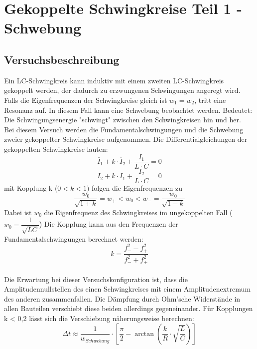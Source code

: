 \documentclass[12pt,a4paper]{article}
\begin{document}
\newpage
\section{Gekoppelte Schwingkreise Teil 1 - Schwebung}
\subsection{Versuchsbeschreibung}
Ein LC-Schwingkreis kann induktiv mit einem zweiten LC-Schwingkreis gekoppelt werden, der dadurch zu erzwungenen Schwingungen angeregt wird. Falls die Eigenfrequenzen der Schwingkreise gleich ist $w_1 = w_2$, tritt eine Resonanz auf. In diesem Fall kann eine Schwebung beobachtet werden. Bedeutet: Die Schwingungsenergie "schwingt" zwischen den Schwingkreisen hin und her. \\
Bei diesem Versuch werden die Fundamentalschwingungen und die Schwebung zweier gekoppelter Schwingkreise aufgenommen. Die Differentialgleichungen der gekoppelten Schwingkreise lauten:
\begin{equation}
\ddot{I_1} + k \cdot \ddot{I_2} + \dfrac{I_1}{L \cdot C} = 0
\end{equation}
\begin{equation}
\ddot{I_2} + k \cdot \ddot{I_1} + \dfrac{I_2}{L \cdot C} = 0
\end{equation}
mit Kopplung k ($0 < k < 1)$ folgen die Eigenfrequenzen zu
\begin{equation}
\dfrac{w_0}{\sqrt{1+k}} = w_+ < w_0 < w_- = \dfrac{w_0}{\sqrt{1-k}} 
\end{equation}
Dabei ist $w_0$ die Eigenfrequenz des Schwingkreises im ungekoppelten Fall ($w_0 = \dfrac{1}{\sqrt{LC}}$)
Die Kopplung kann aus den Frequenzen der Fundamentalschwingungen berechnet werden:
\begin{equation}
k = \dfrac{f_-^2 - f_+^2}{f_-^2 + f_+^2}
\label{eq:Kopplung}
\end{equation}
\\ Die Erwartung bei dieser Versuchskonfiguration ist, dass die Amplitudennullstellen des einen Schwingkreises mit einem Amplitudenextremum des anderen zusammenfallen. Die Dämpfung durch Ohm'sche Widerstände in allen Bauteilen verschiebt diese beiden allerdings gegeneinander. Für Kopplungen k < 0,2 lässt sich die Verschiebung näherungsweise berechnen:
\begin{equation}
\Delta t \approx \dfrac{1}{w_{Schwebung}} \cdot \left[\dfrac{\pi}{2} - \arctan \left( \dfrac{k}{R} \cdot \sqrt{\dfrac{L}{C}} \right)\right]
\label{eq:delta_t}
\end{equation}
\end{document}
